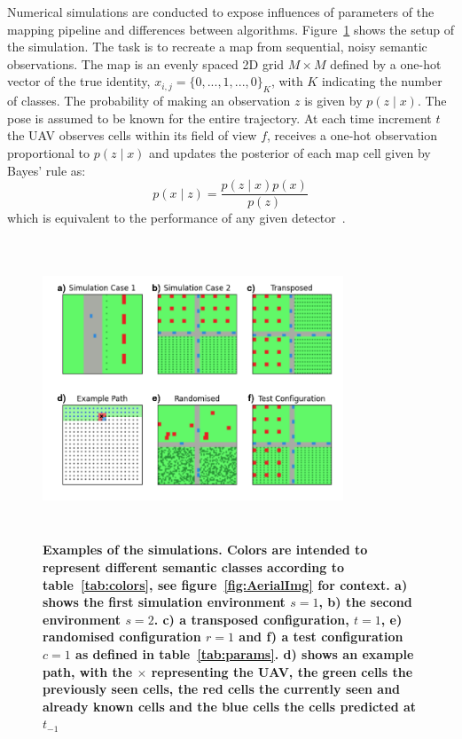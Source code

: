 \documentclass[twocolumn,letterpaper]{IEEEAerospaceCLS}  %
\begin{document}
Numerical simulations are conducted to expose influences of parameters of the mapping pipeline and differences between algorithms. Figure~\ref{fig:SimCase} shows the setup of the simulation. The task is to recreate a map from sequential, noisy semantic observations. The map is an evenly spaced 2D grid $M \times M$ defined by a one-hot vector of the true identity, $x_{i,j} = \{0,..., 1, ..., 0\}_K$, with $K$ indicating the number of classes. The probability of making an observation $z$ is given by $p(z\mid x)$. The pose is assumed to be known for the entire trajectory. At each time increment $t$ the UAV observes cells within its field of view $f$, receives a one-hot observation proportional to $p(z\mid x)$ and updates the posterior of each map cell given by Bayes' rule as:
\begin{equation} \label{eq:Bayes}
    p(x\mid z) = \frac{p(z\mid x) p(x)}{p(z)}
\end{equation}
which is equivalent to the performance of any given detector~\cite{alom_history_2018}.
\begin{figure}[t]
    \centering
    \includegraphics[width=0.8\textwidth,height=3.5in]{SimComp13.png}
    \caption{\bf{
        Examples of the simulations. Colors are intended to represent different semantic classes according to table~\ref{tab:colors}, see figure~\ref{fig:AerialImg} for context. a) shows the first simulation environment $s=1$, b) the second environment $s=2$. c) a transposed configuration, $t=1$, e) randomised configuration $r=1$ and f) a test configuration $c=1$ as defined in table~\ref{tab:params}. d) shows an example path, with the $\times$ representing the UAV, the green cells the previously seen cells, the red cells the currently seen and already known cells and the blue cells the cells predicted at $t_{-1}$ 
    }}
    \label{fig:SimCase}
\end{figure}
\end{document}
